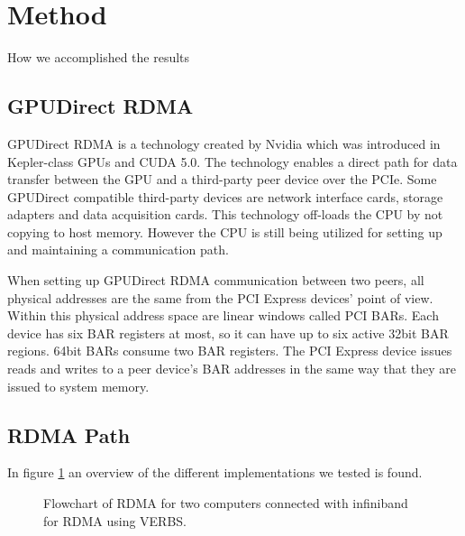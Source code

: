 \documentclass[a4paper,onecolumn]{article}
\begin{document}
\pagebreak
\section{Method}

How we accomplished the results

\subsection{GPUDirect RDMA}
GPUDirect RDMA is a technology created by Nvidia which was introduced in Kepler-class GPUs and CUDA 5.0. The technology enables a direct path for data transfer between the GPU and a third-party peer device over the PCIe. Some GPUDirect compatible third-party devices are network interface cards, storage adapters and data acquisition cards. This technology off-loads the CPU by not copying to host memory. However the CPU is still being utilized for setting up and maintaining a communication path. 

When setting up GPUDirect RDMA communication between two peers, all physical addresses are the same from the PCI Express devices' point of view. Within this physical address space are linear windows called PCI BARs. Each device has six BAR registers at most, so it can have up to six active 32bit BAR regions. 64bit BARs consume two BAR registers. The PCI Express device issues reads and writes to a peer device's BAR addresses in the same way that they are issued to system memory.

\subsection{RDMA Path}
In figure \ref{HLA} an overview of the different implementations we tested is found. 


\begin{figure}[H]
\begin{center}
\caption{Flowchart of RDMA for two computers connected with infiniband for RDMA using VERBS.}
\label{HLA}
\end{center}
\end{figure}
\end{document}
